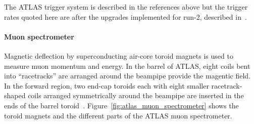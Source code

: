 The ATLAS trigger system is described in the references above but the trigger rates quoted here are after the upgrades implemented for run-2, described in~\cite{martinez_run-2_2016}.

\paragraph*{Muon spectrometer} \hfill \break
Magnetic deflection by superconducting air-core toroid magnets is used to measure muon momentum and energy. In the barrel of ATLAS, eight coils bent into ``racetracks'' are arranged around the beampipe provide the magentic field. In the forward region, two end-cap toroids each with eight smaller racetrack-shaped coils arranged symmetrically around the beampipe are inserted in the ends of the barrel toroid~\cite{atlas_magnet_tdr}. Figure~\ref{fig:atlas_muon_spectrometer} shows the toroid magnets and the different parts of the ATLAS muon spectrometer.


